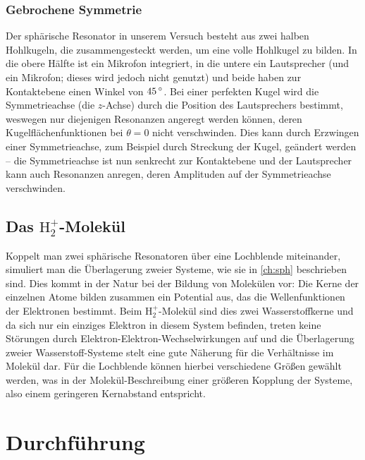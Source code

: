 \documentclass[numbers=noenddot,12pt,a4paper]{scrartcl}
\newcommand{\degree}{^\circ}
\begin{document}
\subsubsection{Gebrochene Symmetrie}
Der sphärische Resonator in unserem Versuch besteht aus zwei halben Hohlkugeln, die zusammengesteckt werden, um eine volle Hohlkugel zu bilden. In die obere Hälfte ist ein Mikrofon integriert, in die untere ein Lautsprecher (und ein Mikrofon; dieses wird jedoch nicht genutzt) und beide haben zur Kontaktebene einen Winkel von $\unit[45]{\degree}$. Bei einer perfekten Kugel wird die Symmetrieachse (die $z$-Achse) durch die Position des Lautsprechers bestimmt, weswegen nur diejenigen Resonanzen angeregt werden können, deren Kugelflächenfunktionen bei $\theta=0$ nicht verschwinden. Dies kann durch Erzwingen einer Symmetrieachse, zum Beispiel durch Streckung der Kugel, geändert werden -- die Symmetrieachse ist nun senkrecht zur Kontaktebene und der Lautsprecher kann auch Resonanzen anregen, deren Amplituden auf der Symmetrieachse verschwinden.
\subsection{Das $\text{H}_2^+$-Molekül}
Koppelt man zwei sphärische Resonatoren über eine Lochblende miteinander, simuliert man die Überlagerung zweier Systeme, wie sie in \ref{ch:sph} beschrieben sind. Dies kommt in der Natur bei der Bildung von Molekülen vor: Die Kerne der einzelnen Atome bilden zusammen ein Potential aus, das die Wellenfunktionen der Elektronen bestimmt. Beim $\text{H}_2^+$-Molekül sind dies zwei Wasserstoffkerne und da sich nur ein einziges Elektron in diesem System befinden, treten keine Störungen durch Elektron-Elektron-Wechselwirkungen auf und die Überlagerung zweier Wasserstoff-Systeme stelt eine gute Näherung für die Verhältnisse im Molekül dar. Für die Lochblende können hierbei verschiedene Größen gewählt werden, was in der Molekül-Beschreibung einer größeren Kopplung der Systeme, also einem geringeren Kernabstand entspricht.
\section{Durchführung}
\end{document}
